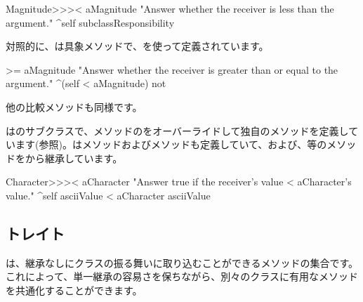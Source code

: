 \documentclass[a4paper,10pt,twoside]{book}
\begin{document}
\begin{method}[MagnitudeLessThan]{}
Magnitude>>>< aMagnitude 
	"Answer whether the receiver is less than the argument."
	^self subclassResponsibility
\end{method}

\noindent
対照的に、は具象メソッドで、\ct{<}を使って定義されています。

\begin{method}[Magnitude>=]{}
>= aMagnitude 
	"Answer whether the receiver is greater than or equal to the argument."
	^(self < aMagnitude) not
\end{method}
他の比較メソッドも同様です。

はのサブクラスで、\ct{<}メソッドのをオーバーライドして独自のメソッドを定義しています(参照)。は\ct{=}メソッドおよびメソッドも定義していて、\ct{>=}および\ct{<=}、\ct{~=}等のメソッドをから継承しています。

\begin{method}[CharacterLessThan]{}
Character>>>< aCharacter 
	"Answer true if the receiver's value < aCharacter's value."
	^self asciiValue < aCharacter asciiValue
\end{method}

\subsection{トレイト}
は、継承なしにクラスの振る舞いに取り込むことができるメソッドの集合です。
これによって、単一継承の容易さを保ちながら、別々のクラスに有用なメソッドを共通化することができます。
\end{document}
